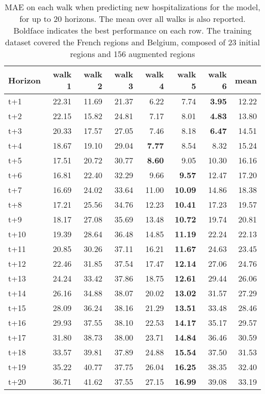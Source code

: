 \begin{table}[H]
\centering
\caption{MAE on each walk when predicting new hospitalizations for the model, for up to 20 horizons. The mean over all walks is also reported. Boldface indicates the best performance on each row. The training dataset covered the French regions and Belgium, composed of 23 initial regions and 156 augmented regions }
\label{tab:MAE_walk_encoder_decoder}
\begin{tabular}{lrrrrrrr}
\toprule
Horizon &  walk 1 &  walk 2 &  walk 3 &  walk 4 &  walk 5 &  walk 6 &  mean \\
\midrule
t+1  & 22.31  & 11.69  & 21.37  & 6.22  & 7.74  & \textbf{3.95}  & 12.22  \\
t+2  & 22.15  & 15.82  & 24.81  & 7.17  & 8.01  & \textbf{4.83}  & 13.80  \\
t+3  & 20.33  & 17.57  & 27.05  & 7.46  & 8.18  & \textbf{6.47}  & 14.51  \\
t+4  & 18.67  & 19.10  & 29.04  & \textbf{7.77}  & 8.54  & 8.32  & 15.24  \\
t+5  & 17.51  & 20.72  & 30.77  & \textbf{8.60}  & 9.05  & 10.30  & 16.16  \\
t+6  & 16.81  & 22.40  & 32.29  & 9.66  & \textbf{9.57}  & 12.47  & 17.20  \\
t+7  & 16.69  & 24.02  & 33.64  & 11.00  & \textbf{10.09}  & 14.86  & 18.38  \\
t+8  & 17.21  & 25.56  & 34.76  & 12.23  & \textbf{10.41}  & 17.23  & 19.57  \\
t+9  & 18.17  & 27.08  & 35.69  & 13.48  & \textbf{10.72}  & 19.74  & 20.81  \\
t+10  & 19.39  & 28.64  & 36.48  & 14.85  & \textbf{11.19}  & 22.24  & 22.13  \\
t+11  & 20.85  & 30.26  & 37.11  & 16.21  & \textbf{11.67}  & 24.63  & 23.45  \\
t+12  & 22.46  & 31.85  & 37.54  & 17.47  & \textbf{12.14}  & 27.06  & 24.76  \\
t+13  & 24.24  & 33.42  & 37.86  & 18.75  & \textbf{12.61}  & 29.44  & 26.06  \\
t+14  & 26.16  & 34.88  & 38.07  & 20.02  & \textbf{13.02}  & 31.57  & 27.29  \\
t+15  & 28.09  & 36.24  & 38.16  & 21.29  & \textbf{13.51}  & 33.48  & 28.46  \\
t+16  & 29.93  & 37.55  & 38.10  & 22.53  & \textbf{14.17}  & 35.17  & 29.57  \\
t+17  & 31.80  & 38.73  & 38.00  & 23.71  & \textbf{14.84}  & 36.46  & 30.59  \\
t+18  & 33.57  & 39.81  & 37.89  & 24.88  & \textbf{15.54}  & 37.50  & 31.53  \\
t+19  & 35.22  & 40.77  & 37.75  & 26.04  & \textbf{16.25}  & 38.35  & 32.40  \\
t+20  & 36.71  & 41.62  & 37.55  & 27.15  & \textbf{16.99}  & 39.08  & 33.19  \\

\bottomrule
\end{tabular}
\end{table}
